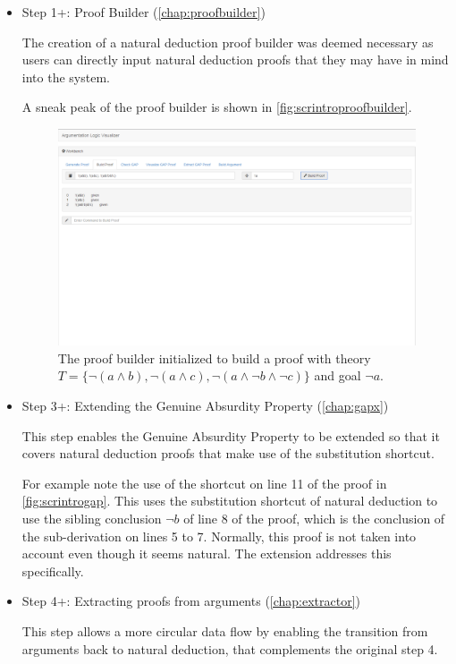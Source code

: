\documentclass[11pt,twoside,a4paper]{report}
\begin{document}
\begin{itemize}
\item
Step 1+: Proof Builder (\autoref{chap:proofbuilder})

The creation of a natural deduction proof builder was deemed necessary as users can directly input natural deduction proofs that they may have in mind into the system.

A sneak peak of the proof builder is shown in \autoref{fig:scrintroproofbuilder}.

\begin{figure}[htp]
\centerline{\includegraphics[scale=0.3]{img/scr-client-proofbuilder.png}}
\caption{The proof builder initialized to build a proof with theory $T = \{\neg(a\wedge b), \neg(a\wedge c), \neg(a\wedge\neg b \wedge\neg c)\}$ and goal $\neg a$.\label{fig:scrintroproofbuilder}}
\end{figure}
\item
Step 3+: Extending the Genuine Absurdity Property (\autoref{chap:gapx})

This step enables the Genuine Absurdity Property to be extended so that it covers natural deduction proofs that make use of the substitution shortcut.

For example note the use of the shortcut on line 11 of the proof in \autoref{fig:scrintrogap}. This uses the substitution shortcut of natural deduction to use the sibling conclusion $\neg b$ of line 8 of the proof, which is the conclusion of the sub-derivation on lines 5 to 7. Normally, this proof is not taken into account even though it seems natural. The extension addresses this specifically.
\item
Step 4+: Extracting proofs from arguments (\autoref{chap:extractor})

This step allows a more circular data flow by enabling the transition from arguments back to natural deduction, that complements the original step 4.


\end{itemize}
\end{document}
